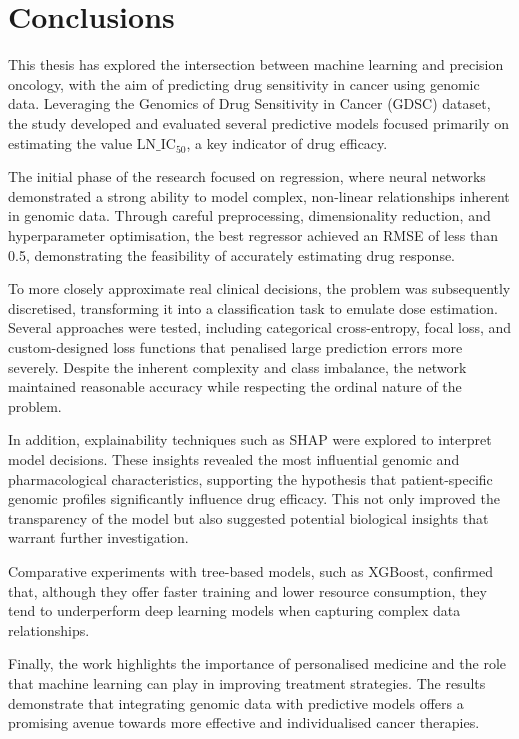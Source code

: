 \chapter{Conclusions}\label{cap:conclusiones}

This thesis has explored the intersection between machine learning and precision oncology, with the aim of predicting drug sensitivity in cancer using genomic data. Leveraging the Genomics of Drug Sensitivity in Cancer (GDSC) dataset, the study developed and evaluated several predictive models focused primarily on estimating the value \( \text{LN\_IC}_{50} \), a key indicator of drug efficacy.

The initial phase of the research focused on regression, where neural networks demonstrated a strong ability to model complex, non-linear relationships inherent in genomic data. Through careful preprocessing, dimensionality reduction, and hyperparameter optimisation, the best regressor achieved an RMSE of less than 0.5, demonstrating the feasibility of accurately estimating drug response.

To more closely approximate real clinical decisions, the problem was subsequently discretised, transforming it into a classification task to emulate dose estimation. Several approaches were tested, including categorical cross-entropy, focal loss, and custom-designed loss functions that penalised large prediction errors more severely. Despite the inherent complexity and class imbalance, the network maintained reasonable accuracy while respecting the ordinal nature of the problem.

In addition, explainability techniques such as SHAP were explored to interpret model decisions. These insights revealed the most influential genomic and pharmacological characteristics, supporting the hypothesis that patient-specific genomic profiles significantly influence drug efficacy. This not only improved the transparency of the model but also suggested potential biological insights that warrant further investigation.

Comparative experiments with tree-based models, such as XGBoost, confirmed that, although they offer faster training and lower resource consumption, they tend to underperform deep learning models when capturing complex data relationships.

Finally, the work highlights the importance of personalised medicine and the role that machine learning can play in improving treatment strategies. The results demonstrate that integrating genomic data with predictive models offers a promising avenue towards more effective and individualised cancer therapies.